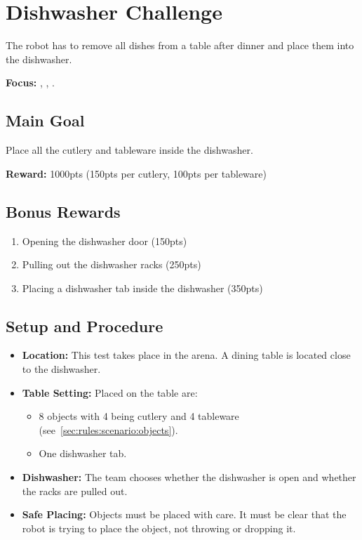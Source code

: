 \section{Dishwasher Challenge}
\label{test:clean-the-table}
The robot has to remove all dishes from a table after dinner and place them into the dishwasher.

\noindent \textbf{Focus:} \SysI, \MAN{} \CV{}, \OR{}.

\subsection*{Main Goal}
Place all the cutlery and tableware inside the dishwasher.

\noindent\textbf{Reward:} 1000pts (150pts per cutlery, 100pts per tableware)

\subsection*{Bonus Rewards}
\begin{enumerate}[nosep]
	\item Opening the dishwasher door (150pts)
	\item Pulling out the dishwasher racks (250pts)
	\item Placing a dishwasher tab inside the dishwasher (350pts)
\end{enumerate}

\subsection*{Setup and Procedure}
\begin{itemize}[nosep]
	\item \textbf{Location:} This test takes place in the arena. A dining table is located close to the dishwasher.

	\item \textbf{Table Setting:} Placed on the table are:
	\begin{itemize}[nosep]
		\item 8 objects with 4 being cutlery and 4 tableware (see~\ref{sec:rules:scenario:objects}).
		\item One dishwasher tab.
	\end{itemize}

	\item \textbf{Dishwasher:} The team chooses whether the dishwasher is open and whether the racks are pulled out.

	\item \textbf{Safe Placing:} Objects must be placed with care. It must be clear that the robot is trying to place the object, not throwing or dropping it.
\end{itemize}


